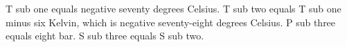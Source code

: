T sub one equals negative seventy degrees Celsius. T sub two equals T sub one minus six Kelvin, which is negative seventy-eight degrees Celsius. P sub three equals eight bar. S sub three equals S sub two.